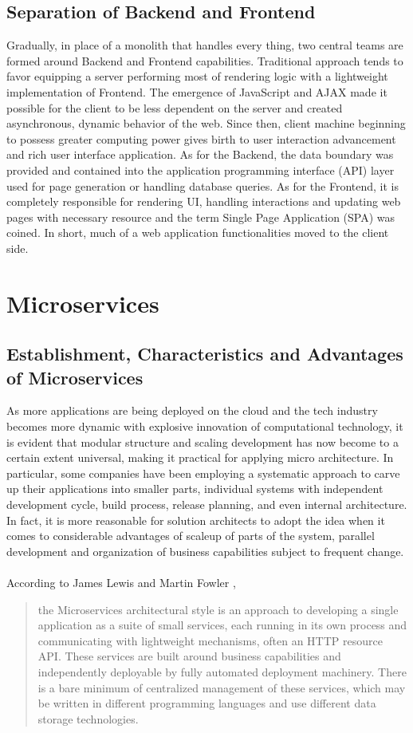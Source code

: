 \documentclass[a4paper]{book}
\begin{document}
\subsection{Separation of Backend and Frontend}

Gradually, in place of a monolith that handles every thing, two central teams are formed around Backend and Frontend capabilities. Traditional approach tends to favor equipping a server performing most of rendering logic with a lightweight implementation of Frontend. 
The emergence of JavaScript and AJAX made it possible for the client to be less dependent on the server and created asynchronous, dynamic behavior of the web. Since then, client machine beginning to possess greater computing power gives birth to user interaction advancement and rich user interface application. As for the Backend, the data boundary was provided and contained into the application programming interface (API) layer used for page generation or handling database queries. As for the Frontend, it is completely responsible for rendering UI, handling interactions and updating web pages with necessary resource and the term Single Page Application (SPA) was coined. In short, much of a web application functionalities moved to the client side.

\section{Microservices}

\subsection{Establishment, Characteristics and Advantages of Microservices}
As more applications are being deployed on the cloud and the tech industry becomes more dynamic with explosive innovation of computational technology, it is evident that modular structure and scaling development has now become to a certain extent universal, making it practical for applying micro architecture. In particular, some companies have been employing a systematic approach to carve up their applications into smaller parts, individual systems with independent development cycle, build process, release planning, and even internal architecture. In fact, it is more reasonable for solution architects to adopt the idea when it comes to considerable advantages of scaleup of parts of the system, parallel development and organization of business capabilities subject to frequent change. 
\\ \\
According to James Lewis and Martin Fowler \cite{Lew14}, 
\begin{quote}
    the Microservices architectural style is an approach to developing a single application as a suite of small services, each running in its own process and communicating with lightweight mechanisms, often an HTTP resource API. These services are built around business capabilities and independently deployable by fully automated deployment machinery. There is a bare minimum of centralized management of these services, which may be written in different programming languages and use different data storage technologies.
\end{quote}
\end{document}
